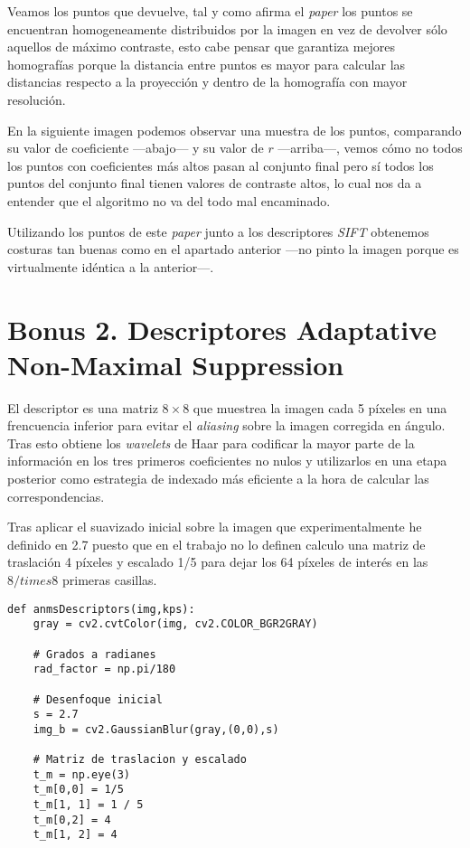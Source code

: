 \documentclass{article}
\newcommand{\img}[2]{
\noindent\makebox[\textwidth][c]{\texttt{[image: \#1]}}%
}
\begin{document}
Veamos los puntos que devuelve, tal y como afirma el \textit{paper} los puntos se encuentran homogeneamente distribuidos por la imagen en vez de devolver sólo aquellos de máximo contraste, esto cabe pensar que garantiza mejores homografías porque la distancia entre puntos es mayor para calcular las distancias respecto a la proyección y dentro de la homografía con mayor resolución.
\\

\img{img/b1_1}{0.6}

En la siguiente imagen podemos observar una muestra de los puntos, comparando su valor de coeficiente ---abajo--- y su valor de $r$ ---arriba---, vemos cómo no todos los puntos con coeficientes más altos pasan al conjunto final pero sí todos los puntos del conjunto final tienen valores de contraste altos, lo cual nos da a entender que el algoritmo no va del todo mal encaminado.
\\

\img{img/b1_2}{1}

Utilizando los puntos de este \textit{paper} junto a los descriptores \textit{SIFT} obtenemos costuras tan buenas como en el apartado anterior ---no pinto la imagen porque es virtualmente idéntica a la anterior---.

\section{Bonus 2. Descriptores Adaptative Non-Maximal Suppression}

El descriptor es una matriz $8 \times 8$ que muestrea la imagen cada 5 píxeles en una frencuencia inferior para evitar el \textit{aliasing} sobre la imagen corregida en ángulo. Tras esto obtiene los \textit{wavelets} de Haar para codificar la mayor parte de la información en los tres primeros coeficientes no nulos y utilizarlos en una etapa posterior como estrategia de indexado más eficiente a la hora de calcular las correspondencias.

Tras aplicar el suavizado inicial sobre la imagen que experimentalmente he definido en 2.7 puesto que en el trabajo no lo definen calculo una matriz de traslación 4 píxeles y escalado 1/5 para dejar los 64 píxeles de interés en las $8 /times 8$ primeras casillas.

\begin{lstlisting}
def anmsDescriptors(img,kps):
    gray = cv2.cvtColor(img, cv2.COLOR_BGR2GRAY)
	
	# Grados a radianes
    rad_factor = np.pi/180
    
    # Desenfoque inicial
    s = 2.7
    img_b = cv2.GaussianBlur(gray,(0,0),s)
    
    # Matriz de traslacion y escalado
    t_m = np.eye(3)
    t_m[0,0] = 1/5
    t_m[1, 1] = 1 / 5
    t_m[0,2] = 4
    t_m[1, 2] = 4
   
\end{lstlisting}
\end{document}

